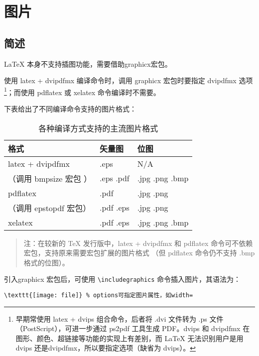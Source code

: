 \chapter{图片}\label{chap:figure}
\section{简述}\label{sec:figure-intro}
\LaTeX{} 本身不支持插图功能，需要借助graphicx宏包。

使用 latex + dvipdfmx 编译命令时，调用 graphicx 宏包时要指定 dvipdfmx 选项\footnote{早期常使用 latex + dvips 组合命令，后者将 .dvi 文件转为 .ps 文件（PostScript），可进一步通过 ps2pdf 工具生成 PDF。dvips 和 dvipdfmx 在图形、颜色、超链接等功能的实现上有差别，而 \LaTeX{} 无法识别用户是用 dvips 还是dvipdfmx，所以要指定选项（缺省为 dvips）。}；而使用 pdflatex 或 xelatex 命令编译时不需要。

下表给出了不同编译命令支持的图片格式：

\begin{table}[htp]
    \centering
    \caption{各种编译方式支持的主流图片格式}\label{tbl:figure-format}
    \begin{tabular}{*{3}{l}}
        \hline
        \textbf{格式}              & \textbf{矢量图} & \textbf{位图}      \\
        \hline
        {latex + dvipdfmx}       & {.eps}       & N/A              \\
        \quad （调用 {bmpsize} 宏包 ） & {.eps .pdf}  & {.jpg .png .bmp} \\[.3\baselineskip]
        {pdflatex}               & {.pdf}       & {.jpg .png}      \\
        \quad （调用 {epstopdf} 宏包） & {.pdf .eps}  & {.jpg .png}      \\[.3\baselineskip]
        {xelatex}                & {.pdf .eps}  & {.jpg .png .bmp} \\
        \hline
    \end{tabular}
    \begin{quote}\footnotesize
        注：在较新的 \TeX{} 发行版中，{latex + dvipdfmx} 和 {pdf\-latex} 命令可不依赖宏包，支持原来需要宏包扩展的图片格式
        （但 {pdf\-latex} 命令仍不支持 {.bmp} 格式的位图）。
    \end{quote}
\end{table}

引入graphicx 宏包后，可使用 \lstinline|\includegraphics| 命令插入图片，其语法为：


\begin{lstlisting}
\texttt{[image: file]} % options可指定图片属性，如width=
\end{lstlisting}


